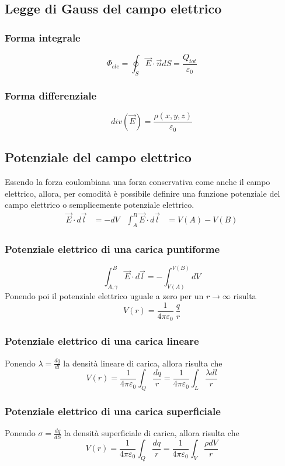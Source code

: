 \documentclass[12pt,a4paper]{report}
\begin{document}
	\subsection{Legge di Gauss del campo elettrico}
		\subsubsection{Forma integrale}
			\[\Phi_{ele}=\oint_{S} \vec{E} \cdot \vec{n} dS = \frac{Q_{tot}}{\varepsilon_{0}}\]
		\subsubsection{Forma differenziale}
			\[div(\vec{E}) = \frac{\rho(x,y,z)}{\varepsilon_{0}}\]
	\subsection{Potenziale del campo elettrico}
Essendo la forza coulombiana una forza conservativa come anche il campo elettrico, allora, per comodità è possibile definire una funzione potenziale del campo elettrico o semplicemente potenziale elettrico.
	\begin{align*}
		\vec{E} \cdot d\vec{l} &= -dV  & \int_{A}^{B} \vec{E} \cdot d\vec{l} &= V(A) - V(B) 
	\end{align*}
		\subsubsection{Potenziale elettrico di una carica puntiforme}
		\[\int_{A,\gamma}^B \vec{E} \cdot d\vec{l} = -\int_{V(A)}^{V(B)} dV \]
Ponendo poi il potenziale elettrico uguale a zero per un $r \rightarrow \infty $ risulta
		\[V(r)=\frac{1}{4 \pi \varepsilon_{0}}~\frac{q}{r}\]
		\subsubsection{Potenziale elettrico di una carica lineare}
Ponendo $\lambda = \frac{dq}{dl}$ la densità lineare di carica, allora risulta che
		\[V(r)=\frac{1}{4 \pi \varepsilon_{0}} \int_{Q}\frac{dq}{r} = \frac{1}{4 \pi \varepsilon_{0}}\int_{L} \frac{\lambda dl}{r}\]		
		\subsubsection{Potenziale elettrico di una carica superficiale}
Ponendo $\sigma = \frac{dq}{dS}$ la densità superficiale di carica, allora risulta che
		\[V(r)=\frac{1}{4 \pi \varepsilon_{0}} \int_{Q}\frac{dq}{r} = \frac{1}{4 \pi \varepsilon_{0}}\int_{V} \frac{\rho dV}{r}\]	
\end{document}
